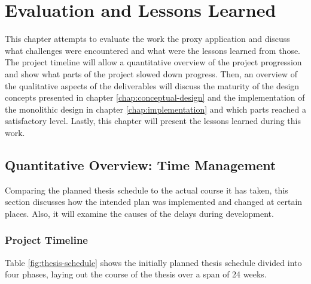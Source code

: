 \chapter{Evaluation and Lessons Learned}
\label{chap:evaluation}
This chapter attempts to evaluate the work the proxy application and discuss what challenges were encountered and what were the lessons learned from those. The project timeline will allow a quantitative overview of the project progression and show what parts of the project slowed down progress. Then, an overview of the qualitative aspects of the deliverables will discuss the maturity of the design concepts presented in chapter \ref{chap:conceptual-design} and the implementation of the monolithic design in chapter \ref{chap:implementation} and which parts reached a satisfactory level. Lastly, this chapter will present the lessons learned during this work.

\section{Quantitative Overview: Time Management}
\label{sec:pm-time-management}
Comparing the planned thesis schedule to the actual course it has taken, this section discusses how the intended plan was implemented and changed at certain places. Also, it will examine the causes of the delays during development.
\subsection{Project Timeline}
\label{sec:project-timeline}
Table \ref{fig:thesis-schedule} shows the initially planned thesis schedule divided into four phases, laying out the course of the thesis over a span of 24 weeks.


